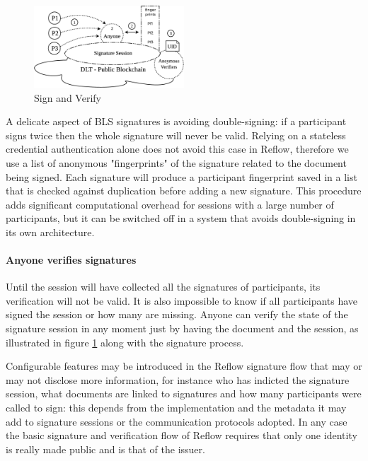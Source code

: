 \documentclass[twocolumn]{article}
\begin{document}
\begin{figure}
  \caption{Sign and Verify}
  \label{fig:verify_sign}
  \centering
  \includegraphics[width=0.5\textwidth]{verify_sign.eps}
\end{figure}

A delicate aspect of BLS signatures is avoiding double-signing: if a
participant signs twice then the whole signature will never be valid.
Relying on a stateless credential authentication alone does not avoid
this case in Reflow, therefore we use a list of anonymous
"fingerprints" of the signature related to the document being signed.
Each signature will produce a participant fingerprint saved in a list
that is checked against duplication before adding a new
signature. This procedure adds significant computational overhead for
sessions with a large number of participants, but it can be switched
off in a system that avoids double-signing in its own architecture.

\paragraph*{Anyone verifies signatures}

Until the session will have collected all the signatures of
participants, its verification will not be valid. It is also
impossible to know if all participants have signed the session or how
many are missing. Anyone can verify the state of the signature session
in any moment just by having the document and the session, as
illustrated in figure \ref{fig:verify_sign} along with the signature
process.

Configurable features may be introduced in the Reflow signature
flow that may or may not disclose more information, for instance who
has indicted the signature session, what documents are linked to
signatures and how many participants were called to sign: this depends
from the implementation and the metadata it may add to signature
sessions or the communication protocols adopted.  In any case the
basic signature and verification flow of Reflow requires that
only one identity is really made public and is that of the issuer.
\end{document}
